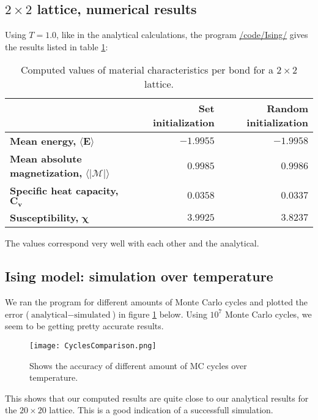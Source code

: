 \documentclass[../main.tex]{subfiles}
\begin{document}
\subsection{$2 \times 2$ lattice, numerical results}
Using $T = 1.0$, like in the analytical calculations, the program \href{https://github.com/kmaasrud/Project-4/tree/master/code/Ising}{/code/Ising/} gives the results listed in table \ref{tab:2x2computed}:
\begin{table}[!h]
  \begin{center}
    \begin{tabular}{| l | r | r |}
      \hline
       & \textbf{Set initialization} & \textbf{Random initialization} \\
      \hline
      \textbf{Mean energy,} $\mathbf{\langle E \rangle}$ & $-1.9955$ & $-1.9958$\\
      \hline
      \textbf{Mean absolute magnetization,} $\mathbf{\langle |\mathcal{M}| \rangle}$ & $0.9985$ & $0.9986$ \\
      \hline
      \textbf{Specific heat capacity,} $\mathbf{C_v}$ & $0.0358$ & $0.0337$ \\
      \hline
      \textbf{Susceptibility,} $\mathbf \chi$ & $3.9925$ & $3.8237$ \\
      \hline
    \end{tabular}
    \caption{Computed values of material characteristics per bond for a $2\times 2$ lattice.}
    \label{tab:2x2computed}
  \end{center}
\end{table}
\FloatBarrier
The values correspond very well with each other and the analytical.

\subsection{Ising model: simulation over temperature} \label{sec:res-compareanalytical}
We ran the program for different amounts of Monte Carlo cycles and plotted the error ($\text{analytical} - \text{simulated}$) in figure \ref{fig:results-MCplot} below. Using $10^7$ Monte Carlo cycles, we seem to be getting pretty accurate results.

\begin{figure}[!h]
  \texttt{[image: CyclesComparison.png]}
  \caption{Shows the accuracy of different amount of MC cycles over temperature.}
  \label{fig:results-MCplot}
\end{figure}
\FloatBarrier
This shows that our computed results are quite close to our analytical results for the $20\times 20$ lattice. This is a good indication of a successfull simulation.
\end{document}
